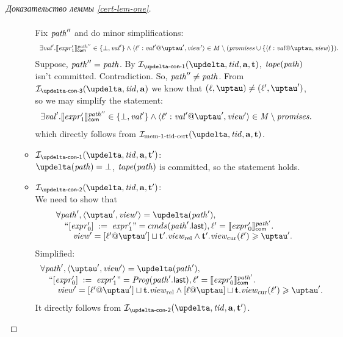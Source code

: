 \begin{proof}[Доказательство леммы \ref{cert-lem-one}]
\begin{itemize}
\begin{itemize}
\[\begin{array}{l}
          \end{array}\]
          Fix $\mathit{path}''$ and do minor simplifications:
          \[\begin{array}{l}
      \exists \stval'. \semfcom{\expr'_1}{\cpath''} \in \{\bot, \stval'\} \land
      \writeEvt{\loc'}{\stval'}{\tau'}{\R'} \in \Mprom \setminus (\PromSet \cup \{\writeEvt{\loc}{\stval}{\tau}{\R}\}). \\
          \end{array}\]
      Suppose, $\mathit{path}'' = \mathit{path}$. By $\invDeltaDefOne(\delta, \tId, \aT, \tT)$, $\mathit{tape}(\mathit{path})$ isn't committed. Contradiction.
      So, $\mathit{path}'' \not = \mathit{path}$.
      From $\invDeltaDefThree(\delta, \tId, \aT)$ we know that $(\loc, \tau) \not = (\loc', \tau')$, so we may simplify the
      statement:
          \[\begin{array}{l}
      \exists \stval'. \semfcom{\expr'_1}{\cpath''} \in \{\bot, \stval'\} \land
      \writeEvt{\loc'}{\stval'}{\tau'}{\R'} \in \Mprom \setminus \PromSet. \\
          \end{array}\]
      which directly follows from $\invMemZeroCERT(\delta, \tId, \aT, \tT)$.

        \item $\invDeltaDefOne(\delta, \tId, \aT, \tT')$: \\
          $\delta(\cpath) = \bot$, $\mathit{tape}(\mathit{path})$ is committed, so the statement holds.
        \item $\invDeltaDefTwo(\delta, \tId, \aT, \tT')$: \\
          We need to show that
          \[\begin{array}{l}
\forall \cpath', \angled{\tau', \R'} = \delta(\cpath'), \\
\quad ``\writeInst{\expr'_0}{\expr'_1}" = \Cprom(\lastInstr{\cpath'}), \loc' = \semfcom{\expr'_0}{\cpath'}. \\
\qquad \R' = [\loc' @ \tau'] \sqcup \tT'.\Rrel \land \tT'.\Rcur(\loc') \ge \tau'. \\
          \end{array}\]
          Simplified:
          \[\begin{array}{l}
\forall \cpath', \angled{\tau', \R'} = \delta(\cpath'), \\
\quad ``\writeInst{\expr'_0}{\expr'_1}" = \Cfarm(\lastInstr{\cpath'}), \loc' = \semfcom{\expr'_0}{\cpath'}. \\
\qquad \R' = [\loc' @ \tau'] \sqcup \tT.\Rrel \land [\loc @ \tau] \sqcup \tT.\Rcur(\loc') \ge \tau'. \\
          \end{array}\]
          It directly follows from $\invDeltaDefTwo(\delta, \tId, \aT, \tT')$.
          

\end{itemize}
\end{itemize}
\end{proof}
